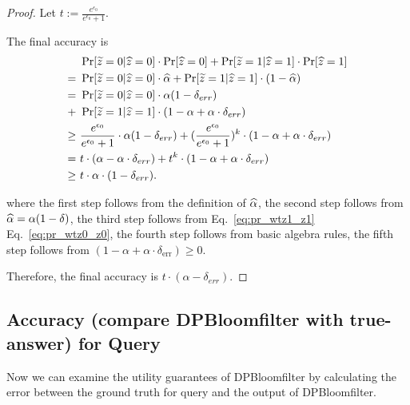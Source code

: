 \begin{proof}
Let $t := \frac{e^{\epsilon_0}}{e^{\epsilon_0} + 1}$. 

The final accuracy is 
\begin{align*}
& ~ \Pr[\widetilde{z} = 0 | \widehat{z} = 0]  \cdot \Pr[ \widehat{z} = 0 ] + \Pr[\widetilde{z} = 1 | \widehat{z} = 1]  \cdot \Pr[ \widehat{z} = 1 ] \\
= & ~ \Pr[\widetilde{z} = 0 | \widehat{z} = 0]  \cdot \widehat{\alpha} + \Pr[\widetilde{z} = 1 | \widehat{z} = 1]  \cdot (1- \widehat{\alpha}) \\
= & ~ \Pr[\widetilde{z} = 0 | \widehat{z} = 0]  \cdot \alpha (1 - \delta_{err}) \\
+ & ~ \Pr[\widetilde{z} = 1 | \widehat{z} = 1]  \cdot (1- \alpha + \alpha \cdot \delta_{err}) \\
\geq & ~ \frac{ e^{\epsilon_0} }{ e^{\epsilon_0} + 1 }  \cdot \alpha (1 - \delta_{err}) + (\frac{ e^{\epsilon_0} }{ e^{\epsilon_0} + 1 })^k  \cdot (1- \alpha + \alpha \cdot \delta_{err}) \notag \\ 
= & ~ t \cdot (\alpha - \alpha \cdot \delta_{err}) + t^k  \cdot (1- \alpha + \alpha \cdot \delta_{err}) \\
\geq & ~ t \cdot \alpha \cdot (1 - \delta_{err}).
\end{align*}



where the first step follows from the definition of $\widehat{\alpha}$, the second step follows from $ \widehat{\alpha} = \alpha (1 - \delta) $, the third step follows from  Eq.~\eqref{eq:pr_wtz1_z1} Eq.~\eqref{eq:pr_wtz0_z0}, the fourth step follows from basic algebra rules, the fifth step follows from $(1 - \alpha + \alpha \cdot \delta_{\mathrm{err}}) \geq 0$. 

Therefore, the final accuracy is $t \cdot (\alpha - \delta_{err})$. 
\end{proof}

\subsection{Accuracy (compare DPBloomfilter with true-answer) for Query}\label{sec:acc_dpbloom_true}
Now we can examine the utility guarantees of DPBloomfilter by calculating the error between the ground truth for query and the output of DPBloomfilter.

